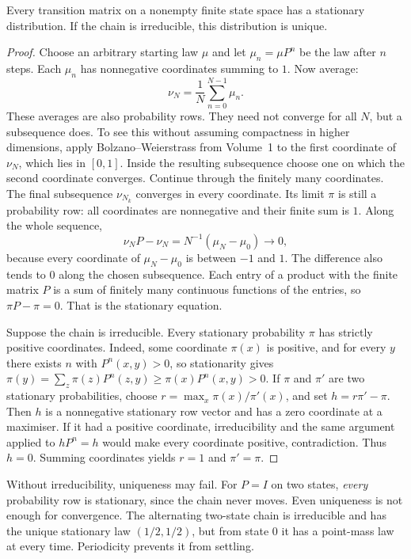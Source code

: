 \begin{theorem}\label{thm:stationary}
Every transition matrix on a nonempty finite state space has a stationary distribution. If the chain is irreducible, this distribution is unique.
\end{theorem}
\begin{proof}
Choose an arbitrary starting law $\mu$ and let $\mu_n=\mu P^n$ be the law after $n$ steps. Each $\mu_n$ has nonnegative coordinates summing to $1$. Now average:
\[
 \nu_N=\frac1N\sum_{n=0}^{N-1}\mu_n.
\]
These averages are also probability rows. They need not converge for all $N$, but a subsequence does. To see this without assuming compactness in higher dimensions, apply Bolzano--Weierstrass from Volume~1 to the first coordinate of $\nu_N$, which lies in $[0,1]$. Inside the resulting subsequence choose one on which the second coordinate converges. Continue through the finitely many coordinates. The final subsequence $\nu_{N_k}$ converges in every coordinate. Its limit $\pi$ is still a probability row: all coordinates are nonnegative and their finite sum is $1$. Along the whole sequence,
\[
 \nu_N P-\nu_N=N^{-1}(\mu_N-\mu_0)\to0,
\]
because every coordinate of $\mu_N-\mu_0$ is between $-1$ and $1$. The difference also tends to $0$ along the chosen subsequence. Each entry of a product with the finite matrix $P$ is a sum of finitely many continuous functions of the entries, so $\pi P-\pi=0$. That is the stationary equation.

Suppose the chain is irreducible. Every stationary probability $\pi$ has strictly positive coordinates. Indeed, some coordinate $\pi(x)$ is positive, and for every $y$ there exists $n$ with $P^n(x,y)>0$, so stationarity gives $\pi(y)=\sum_z\pi(z)P^n(z,y)\ge\pi(x)P^n(x,y)>0$. If $\pi$ and $\pi'$ are two stationary probabilities, choose $r=\max_x\pi(x)/\pi'(x)$, and set $h=r\pi'-\pi$. Then $h$ is a nonnegative stationary row vector and has a zero coordinate at a maximiser. If it had a positive coordinate, irreducibility and the same argument applied to $hP^n=h$ would make every coordinate positive, contradiction. Thus $h=0$. Summing coordinates yields $r=1$ and $\pi'=\pi$.
\end{proof}

Without irreducibility, uniqueness may fail. For $P=I$ on two states, \emph{every} probability row is stationary, since the chain never moves. Even uniqueness is not enough for convergence. The alternating two-state chain is irreducible and has the unique stationary law $(1/2,1/2)$, but from state $0$ it has a point-mass law at every time. Periodicity prevents it from settling.

